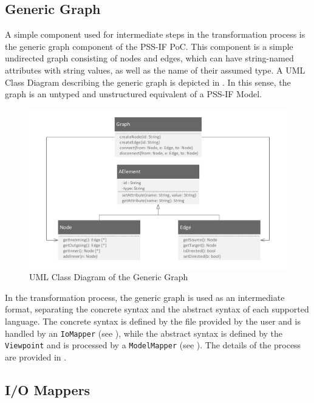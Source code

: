 \subsection{Generic Graph}

A simple component used for intermediate steps in the transformation process is the generic graph component of the PSS-IF PoC. This component is a simple undirected graph consisting of nodes and edges, which can have string-named attributes with string values, as well as the name of their assumed type. A UML Class Diagram describing the generic graph is depicted in . In this sense, the graph is an untyped and unstructured equivalent of a PSS-IF Model.

\begin{figure}[h]
\centering
\includegraphics[scale=0.75]{figures/graph.pdf}
\caption{UML Class Diagram of the Generic Graph}
\label{fig:genericgraph}
\end{figure}

In the transformation process, the generic graph is used as an intermediate format, separating the concrete syntax and the abstract syntax of each supported language. The concrete syntax is defined by the file provided by the user and is handled by an \texttt{IoMapper} (see ), while the abstract syntax is defined by the \texttt{Viewpoint} and is processed by a \texttt{ModelMapper} (see ). The details of the process are provided in .

\subsection{I/O Mappers}
\label{sec:impl:comp:io}

